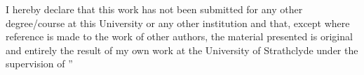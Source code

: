 \documentclass[
12pt, %
oneside, %
english, %
onespacing, %
headsepline, %
]{MastersDoctoralThesis} %
\author{Adam Kidd} %
\begin{document}
\frontmatter %

\pagestyle{plain} %


\begin{titlepage}
\begin{center}



\begin{minipage}{1\textwidth}
\vspace{2.5cm}
\noindent I hereby declare that this work has not been submitted for any other degree/course at this University or any other institution and that, except where reference is made to the work of other authors, the material presented is original and entirely the result of my own work at the University of Strathclyde under the supervision of \supname”

\end{minipage}\\[.1cm]

\vspace{10.5cm}
 
 

\end{center}
\end{titlepage}
\end{document}
